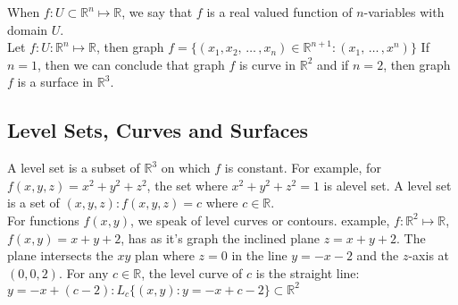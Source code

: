 \documentclass{article}
\newcommand{\R}{\mathbb{R}}
\begin{document}
\noindent
When $f: U\subset\R^n \mapsto \R$, we say that $f$ is a real valued function of $n$-variables with domain $U$.\\

\noindent
Let $f: U:\R^n \mapsto \R$, then graph $f = \{ (x_1, x_2,\, \dots\,, x_n) \in \R^{n + 1} : (x_1,\, \dots\,, x^n)\}$
If $n= 1$, then we can conclude that graph $f$ is curve in $\R^2$ and if $n=2$, then graph $f$ is a surface in $\R^3$.

\subsection{Level Sets, Curves and Surfaces}
A level set is a subset of $\R^3$ on which $f$ is constant. For example, for $f(x, y, z) = x^2 + y^2 + z^2$, the set where $x^2 + y^2 + z^2 = 1$ is alevel set. A level set is a set of $(x, y, z): f(x, y, z) = c$ where $c \in \R$.\\

For functions $f(x, y)$, we speak of level curves or contours. example, $f: \R^2 \mapsto \R$, $f(x, y) = x + y + 2$, has as it's graph the inclined plane $z = x + y + 2$. The plane intersects the $xy$ plan where $z = 0$ in the line $y = -x - 2$ and the $z$-axis at $(0, 0, 2)$. For any $c \in \R$, the level curve of $c$ is the straight line: $y = -x + (c-2): L_c \{(x, y): y = - x + c - 2 \}\subset \R^2$
\end{document}
